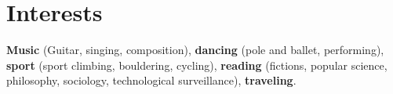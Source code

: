 \documentclass[11pt,a4paper,sans]{moderncv} %
\renewcommand*{\cvitem}[3][.25em]{%
  \ifthenelse{\equal{#2}{}}{}{\hintstyle{#2} }{#3}%
\par\addvspace{#1}}
\begin{document}

\section{Interests}
\textbf{Music} (Guitar, singing, composition), \textbf{dancing} (pole and ballet, performing), \textbf{sport} (sport climbing, bouldering, cycling), \textbf{reading} (fictions, popular science, philosophy, sociology, technological surveillance), \textbf{traveling}.

\end{document}
